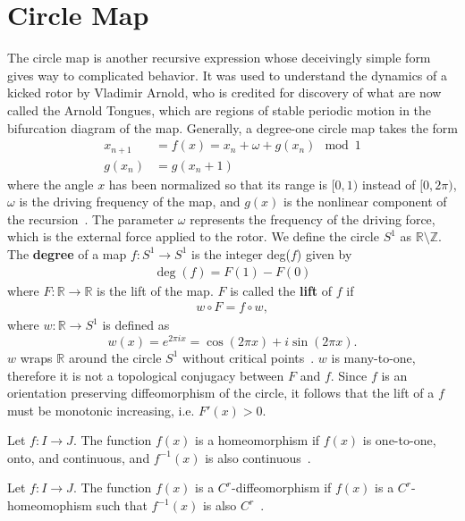 \section{Circle Map}
The circle map is another
recursive expression whose deceivingly simple form gives way to complicated behavior. It was used to
understand the dynamics of a kicked rotor by Vladimir
Arnold, who is credited for discovery of what are now called the Arnold Tongues, which are
regions of stable periodic motion in the bifurcation diagram of the
map. Generally, a degree-one circle map takes the form
\begin{align*}
x_{n+1}&=f(x)=x_n + \omega + g(x_n) \mod 1\\
g(x_n)&=g(x_n + 1)
\end{align*}
where the angle $x$ has been normalized so that its range is $[0,1)$
instead of $[0,2\pi )$, $\omega$ is the driving frequency of the map, and
$g(x)$ is the nonlinear component of the recursion~\cite{rasband}. The
parameter $\omega$ represents the frequency of the driving
force, which is the external force applied to the
rotor. We define the circle $S^1$ as $\mathbb{R} \setminus
\mathbb{Z}$. The \textbf{degree} of a map $f:S^1 \to S^1$ is the integer
deg($f$) given by 
\begin{align*}
\deg(f) = F(1) - F(0)
\end{align*}
where $F:\mathbb{R} \to \mathbb{R}$ is the lift of the
map. $F$ is called the \textbf{lift} of $f$ if
\begin{align*}
w \circ F = f \circ w,
\end{align*}
where $w:\mathbb{R} \to S^1$ is defined as
\begin{equation*}
w(x) = e^{2\pi i x} = \cos(2\pi x) + i\sin(2\pi x).
\end{equation*}
$w$ wraps $\mathbb{R}$ around the circle $S^1$ without critical
points~\cite{devaney}. $w$ is many-to-one, therefore it is not a topological conjugacy
between $F$ and $f$. Since $f$ is an orientation
preserving diffeomorphism of the circle, it follows that the lift of a $f$ must be
monotonic increasing, i.e. $F'(x)>0$.

\begin{singlespacing}
\begin{definition}
Let $f:I \to J$. The function $f(x)$ is a homeomorphism if $f(x)$ is
one-to-one, onto, and continuous, and $f^{-1}(x)$ is also continuous~\cite{devaney}.
\end{definition}
\begin{definition}
Let $f:I\to J$. The function $f(x)$ is a $C^r$-diffeomorphism if
$f(x)$ is a $C^r$-homeomophism such that $f^{-1}(x)$ is also $C^r$~\cite{devaney}. 
\end{definition}
\end{singlespacing}

